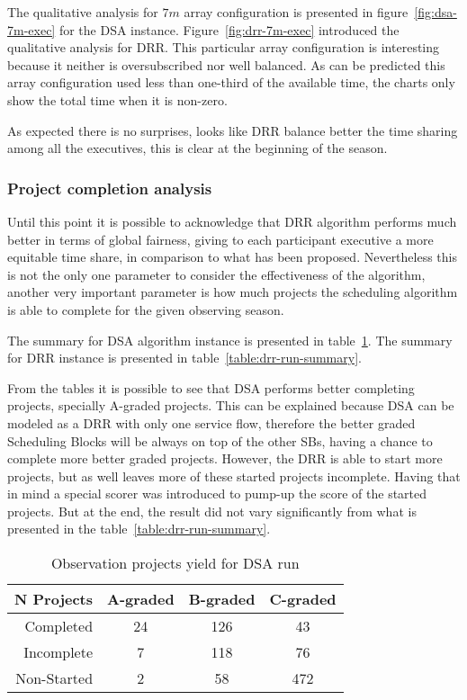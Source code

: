 The qualitative analysis for $7m$ array configuration is presented in figure~\ref{fig:dsa-7m-exec} for the DSA instance. Figure~\ref{fig:drr-7m-exec} introduced the qualitative analysis for DRR. This particular array configuration is interesting because it neither is oversubscribed nor well balanced. As can be predicted this array configuration used less than one-third of the available time, the charts only show the total time when it is non-zero.

As expected there is no surprises, looks like DRR balance better the time sharing among all the executives, this is clear at the beginning of the season. 

\subsubsection{Project completion analysis}

Until this point it is possible to acknowledge that DRR algorithm performs much better in terms of global fairness, giving to each participant executive a more equitable time share, in comparison to what has been proposed. Nevertheless this is not the only one parameter to consider the effectiveness of the algorithm, another very important parameter is how much projects the scheduling algorithm is able to complete for the given observing season.

The summary for DSA algorithm instance is presented in table~\ref{table:dsa-run-summary}. The summary for DRR instance is presented in table~\ref{table:drr-run-summary}.

From the tables it is possible to see that DSA performs better completing projects, specially A-graded projects. This can be explained because DSA can be modeled as a DRR with only one service flow, therefore the better graded Scheduling Blocks will be always on top of the other SBs, having a chance to complete more better graded projects. However, the DRR is able to start more projects, but as well leaves more of these started projects incomplete. Having that in mind a special scorer was introduced to pump-up the score of the started projects. But at the end, the result did not vary significantly from what is presented in the table~\ref{table:drr-run-summary}.

\begin{table}[t!]
\centering
\begin{tabular}{|r|c|c|c|} \hline
 N Projects & A-graded & B-graded & C-graded \\ \hline
 Completed & 24 & 126 & 43 \\ \hline
 Incomplete & 7 & 118 & 76 \\ \hline
 Non-Started & 2 & 58 & 472 \\ \hline
\end{tabular}
\caption{Observation projects yield for DSA run}
\label{table:dsa-run-summary}
\end{table}

